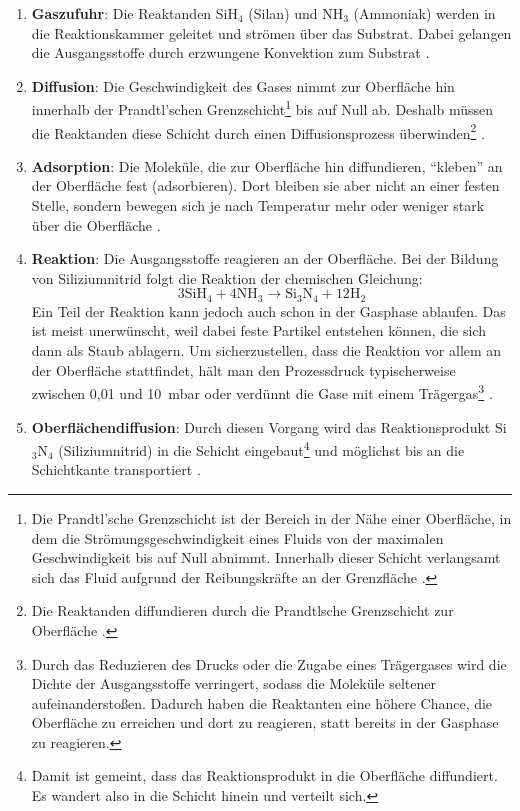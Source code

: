 \documentclass{article} %
\begin{document}
\begin{enumerate}
    \item \textbf{Gaszufuhr}: Die Reaktanden SiH$_4$ (Silan) und NH$_3$ (Ammoniak) werden in die Reaktionskammer geleitet und strömen über das Substrat. Dabei gelangen die Ausgangsstoffe durch erzwungene Konvektion zum Substrat \cite{keplinger2024CVD}.
    \item \textbf{Diffusion}: Die Geschwindigkeit des Gases nimmt zur Oberfläche hin innerhalb der Prandtl'schen Grenzschicht\footnote{Die Prandtl'sche Grenzschicht ist der Bereich in der Nähe einer Oberfläche, in dem die Strömungsgeschwindigkeit eines Fluids von der maximalen Geschwindigkeit bis auf Null abnimmt. Innerhalb dieser Schicht verlangsamt sich das Fluid aufgrund der Reibungskräfte an der Grenzfläche \cite{white2006}.} bis auf Null ab. Deshalb müssen die Reaktanden diese Schicht durch einen Diffusionsprozess überwinden\footnote{Die Reaktanden diffundieren durch die Prandtlsche Grenzschicht zur Oberfläche \cite{bergman2011, incropera2007}.} \cite{keplinger2024CVD}.
    \item \textbf{Adsorption}: Die Moleküle, die zur Oberfläche hin diffundieren, ``kleben'' an der Oberfläche fest (adsorbieren). Dort bleiben sie aber nicht an einer festen Stelle, sondern bewegen sich je nach Temperatur mehr oder weniger stark über die Oberfläche \cite{keplinger2024CVD, bergman2011, incropera2007}.
    \item \textbf{Reaktion}: Die Ausgangsstoffe reagieren an der Oberfläche. Bei der Bildung von Siliziumnitrid folgt die Reaktion der chemischen Gleichung:
    $$
    3\mathrm{SiH}_4 + 4\mathrm{NH}_3 \rightarrow \mathrm{Si}_3\mathrm{N}_4 + 12\mathrm{H}_2
    $$
    Ein Teil der Reaktion kann jedoch auch schon in der Gasphase ablaufen. Das ist meist unerwünscht, weil dabei feste Partikel entstehen können, die sich dann als Staub ablagern. Um sicherzustellen, dass die Reaktion vor allem an der Oberfläche stattfindet, hält man den Prozessdruck typischerweise zwischen 0,01 und 10~mbar oder verdünnt die Gase mit einem Trägergas\footnote{Durch das Reduzieren des Drucks oder die Zugabe eines Trägergases wird die Dichte der Ausgangsstoffe verringert, sodass die Moleküle seltener aufeinanderstoßen. Dadurch haben die Reaktanten eine höhere Chance, die Oberfläche zu erreichen und dort zu reagieren, statt bereits in der Gasphase zu reagieren.} \cite{keplinger2024CVD}.
    \item \textbf{Oberflächendiﬀusion}: Durch diesen Vorgang wird das Reaktionsprodukt Si$_3$N$_4$ (Siliziumnitrid) in die Schicht eingebaut\footnote{Damit ist gemeint, dass das Reaktionsprodukt in die Oberfläche diffundiert. Es wandert also in die Schicht hinein und verteilt sich.} und möglichst bis an die Schichtkante transportiert \cite{keplinger2024CVD}.

\end{enumerate}
\end{document}
